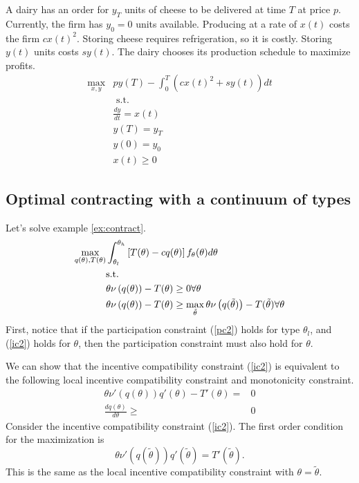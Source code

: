 \begin{example}[Inventory]
  A dairy has an order for $y_T$ units of cheese to be delivered at
  time $T$ at price $p$. Currently, the firm has $y_0 = 0$ units
  available. Producing at a rate of $x(t)$ costs the firm $c
  x(t)^2$. Storing cheese requires refrigeration, so it is
  costly. Storing $y(t)$ units costs $sy(t)$. The dairy chooses its
  production schedule to maximize profits. 
  \begin{align*}
    \max_{x,y} & p y(T) - \int_0^T \left( c x(t)^2  + s y(t) \right)
    dt \\
    & \text{ s.t. } \\
    & \frac{dy}{dt} = x(t) \\
    & y(T) = y_T \\
    & y(0) = y_0 \\
    & x(t) \geq 0 
  \end{align*}
\end{example}

\begin{example}[Epidemic]
  
\end{example}

\subsection{Optimal contracting with a continuum of types} 
Let's solve example \ref{ex:contract}. 
\begin{align}
  \max_{q(\theta),T(\theta)} & \int_{\theta_l}^{\theta_h} 
  \left[T(\theta) - cq(\theta)\right]
  f_\theta(\theta) d\theta \notag \\
  & \text{s.t.} \notag \\
  &\theta \nu\left(q(\theta)\right) - T(\theta) \geq 0  \forall
  \theta \label{pc2} \\
  &\theta \nu\left(q(\theta)\right) - T(\theta) \geq
  \max_{\tilde{\theta}} \theta \nu\left(q(\tilde{\theta}) \right) -
  T(\tilde{\theta}) \forall \theta \label{ic2} 
\end{align}
First, notice that if the participation constraint (\ref{pc2}) holds for type
$\theta_l$, and (\ref{ic2}) holds for $\theta$, then the participation
constraint must also hold for $\theta$. 

We can show that the incentive compatibility constraint (\ref{ic2}) is
equivalent to the following local incentive 
compatibility constraint and monotonicity constraint.
\begin{align}
  \theta \nu'(q(\theta))q'(\theta) - T'(\theta) = & 0 \label{lic} \\
  \frac{dq(\theta)}{d\theta} \geq & 0 \label{mon}
\end{align}
Consider the incentive compatibility constraint
(\ref{ic2}). The first order condition for the maximization is
\[ \theta \nu'(q(\tilde{\theta})) q'(\tilde{\theta}) =
T'(\tilde{\theta}). \]
This is the same as the local incentive compatibility constraint with
$\theta = \tilde{\theta}$.

